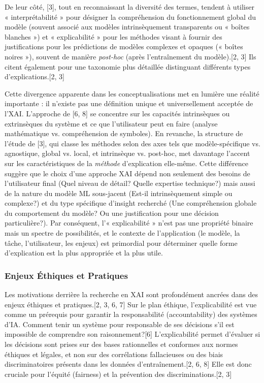 \documentclass[11pt,a4paper]{article}
\begin{document}
De leur côté, \citet{Burkart2021} [3], tout en reconnaissant la diversité des termes, tendent à utiliser « interprétabilité » pour désigner la compréhension du fonctionnement global du modèle (souvent associé aux modèles intrinsèquement transparents ou « boîtes blanches ») et « explicabilité » pour les méthodes visant à fournir des justifications pour les prédictions de modèles complexes et opaques (« boîtes noires »), souvent de manière \textit{post-hoc} (après l'entraînement du modèle).[2, 3] Ils citent également \citet{Gilpin2018} pour une taxonomie plus détaillée distinguant différents types d'explications.[2, 3]

Cette divergence apparente dans les conceptualisations met en lumière une réalité importante : il n'existe pas une définition unique et universellement acceptée de l'XAI. L'approche de \citet{Doran2017} [6, 8] se concentre sur les capacités intrinsèques ou extrinsèques du système et ce que l'utilisateur peut en faire (analyse mathématique vs. compréhension de symboles). En revanche, la structure de l'étude de \citet{Burkart2021} [3], qui classe les méthodes selon des axes tels que modèle-spécifique vs. agnostique, global vs. local, et intrinsèque vs. post-hoc, met davantage l'accent sur les caractéristiques de la \textit{méthode} d'explication elle-même. Cette différence suggère que le choix d'une approche XAI dépend non seulement des besoins de l'utilisateur final (Quel niveau de détail? Quelle expertise technique?) mais aussi de la nature du modèle ML sous-jacent (Est-il intrinsèquement simple ou complexe?) et du type spécifique d'insight recherché (Une compréhension globale du comportement du modèle? Ou une justification pour une décision particulière?). Par conséquent, l'« explicabilité » n'est pas une propriété binaire mais un spectre de possibilités, et le contexte de l'application (le modèle, la tâche, l'utilisateur, les enjeux) est primordial pour déterminer quelle forme d'explication est la plus appropriée et la plus utile.

\subsubsection{Enjeux Éthiques et Pratiques}
Les motivations derrière la recherche en XAI sont profondément ancrées dans des enjeux éthiques et pratiques.[2, 3, 6, 7]
Sur le plan éthique, l'explicabilité est vue comme un prérequis pour garantir la responsabilité (accountability) des systèmes d'IA. Comment tenir un système pour responsable de ses décisions s'il est impossible de comprendre son raisonnement?[6] L'explicabilité permet d'évaluer si les décisions sont prises sur des bases rationnelles et conformes aux normes éthiques et légales, et non sur des corrélations fallacieuses ou des biais discriminatoires présents dans les données d'entraînement.[2, 6, 8] Elle est donc cruciale pour l'équité (fairness) et la prévention des discriminations.[2, 3]
\end{document}
